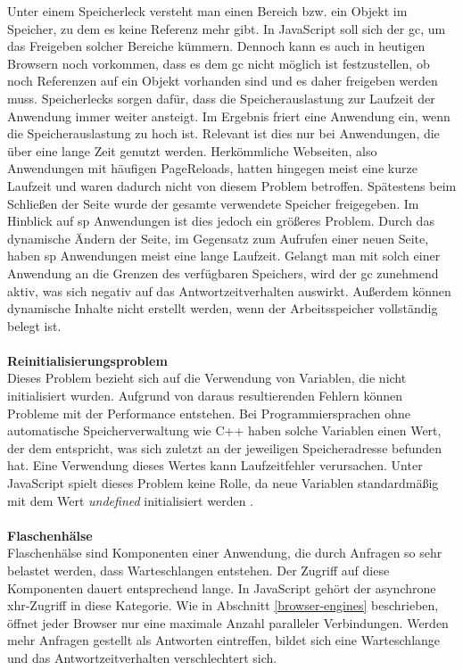 Unter einem Speicherleck versteht man einen Bereich bzw. ein Objekt im Speicher, zu dem es keine Referenz mehr gibt. In JavaScript soll sich der \gls{gc}, um das Freigeben solcher Bereiche kümmern. Dennoch kann es auch in heutigen Browsern noch vorkommen, dass es dem \gls{gc} nicht möglich ist festzustellen, ob noch Referenzen auf ein Objekt vorhanden sind und es daher freigeben werden muss. Speicherlecks sorgen dafür, dass die Speicherauslastung zur Laufzeit der Anwendung  immer weiter ansteigt. Im Ergebnis friert eine Anwendung ein, wenn die Speicherauslastung zu hoch ist. Relevant ist dies nur bei Anwendungen, die über eine lange Zeit genutzt werden. Herkömmliche Webseiten, also Anwendungen mit häufigen \gls{PageReloads}, hatten hingegen meist eine kurze Laufzeit und waren dadurch nicht von diesem Problem betroffen. Spätestens beim Schließen der Seite wurde der gesamte verwendete Speicher freigegeben. Im Hinblick auf \gls{sp} Anwendungen ist dies jedoch ein größeres Problem. Durch das dynamische Ändern der Seite, im Gegensatz zum Aufrufen einer neuen Seite, haben \gls{sp} Anwendungen meist eine lange Laufzeit. Gelangt man mit solch einer Anwendung an die Grenzen des verfügbaren Speichers, wird der \gls{gc} zunehmend aktiv, was sich negativ auf das Antwortzeitverhalten auswirkt. Außerdem können dynamische Inhalte nicht erstellt werden, wenn der Arbeitsspeicher vollständig belegt ist.\cite{JSMemoryLeaks1}\cite{JSMemoryLeaks2}
\\\\
\textbf{Reinitialisierungsproblem}\\Dieses Problem bezieht sich auf die Verwendung von Variablen, die nicht initialisiert wurden. Aufgrund von daraus resultierenden Fehlern können Probleme mit der Performance entstehen. Bei Programmiersprachen ohne automatische Speicherverwaltung wie C++ haben solche Variablen einen Wert, der dem entspricht, was sich zuletzt an der jeweiligen Speicheradresse befunden hat. Eine Verwendung dieses Wertes kann Laufzeitfehler verursachen. Unter JavaScript spielt dieses Problem keine Rolle, da neue Variablen standardmäßig mit dem Wert \emph{undefined} initialisiert werden \cite[S. 41ff.]{Flanagan2011}.
\\\\
\textbf{Flaschenhälse}
\\
Flaschenhälse sind Komponenten einer Anwendung, die durch Anfragen so sehr belastet werden, dass Warteschlangen entstehen. Der Zugriff auf diese Komponenten dauert entsprechend lange. In JavaScript gehört der asynchrone \gls{xhr}-Zugriff in diese Kategorie. Wie in Abschnitt \ref{browser-engines} beschrieben, öffnet jeder Browser nur eine maximale Anzahl paralleler Verbindungen. Werden mehr Anfragen gestellt als Antworten eintreffen, bildet sich eine Warteschlange und das Antwortzeitverhalten verschlechtert sich.
